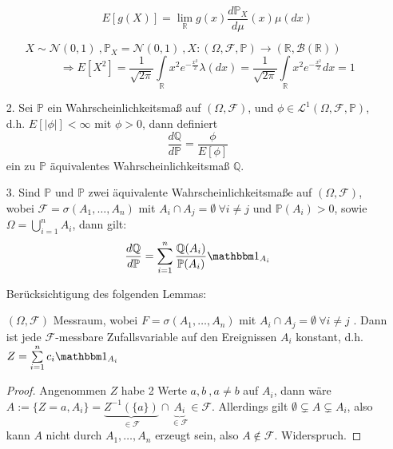 \begin{ex}
\begin{itemize}
\begin{rem}
\begin{enumerate}
\[ E[g(X)]=\lim\limits_{\mathbb R}g(x)\frac{d\mathbb P_{X}}{d\mu}(x)\mu(dx) \]
\begin{ex}
$ X\sim\mathcal N(0,1) \ , \mathbb P_{X}=\mathcal N(0,1) \ , X:(\Omega,\mathcal F,\mathbb P)\to(\mathbb R,\mathcal B(\mathbb R)) $
\[ \Longrightarrow E[X^{2}]=\frac{1}{\sqrt{2\pi}} \int\limits_{\mathbb R} x^{2}e^{-\frac{x^{2}}{2} }\lambda(dx)=\frac{1}{\sqrt{2\pi}}\int\limits_{\mathbb R} x^{2}e^{-\frac{x^{2}}{2} }dx=1 \]
\end{ex}
\end{enumerate}
\end{rem}
\item[2.] Sei $ \mathbb{P} $ ein Wahrscheinlichkeitsmaß auf $ (\Omega,\mathcal F) $, und $ \phi\in\mathcal L^{1}(\Omega,\mathcal F,\mathbb P) $, d.h. $ E[|\phi|]<\infty $ mit $ \phi>0 $, dann definiert
\[ \frac{d\mathbb Q}{d\mathbb P}=\frac{\phi}{E[\phi]} \]
ein zu $ \mathbb P $ äquivalentes Wahrscheinlichkeitsmaß $ \mathbb Q $.
\item[3.] Sind $ \mathbb P $ und $ \mathbb P $ zwei äquivalente Wahrscheinlichkeitsmaße auf $ (\Omega,\mathcal F) $, wobei $ \mathcal F=\sigma(A_{1},\hdots ,A_{n}) $ mit $ A_{i}\cap A_{j}=\emptyset \ \forall i\neq j $ und $ \mathbb{P}(A_{i})>0 $, sowie $ \Omega=\bigcup\limits_{i=1}^{n}A_{i} $, dann gilt:
\[ \frac{d\mathbb Q}{d\mathbb P}=\sum\limits_{i=1}^{n}\frac{\mathbb Q(A_{i})}{\mathbb P (A_{i})}\mathbbm 1_{A_{i}} \]
\begin{hwork}[Beweis]
Berücksichtigung des folgenden Lemmas:
\begin{lem}
$ (\Omega,\mathcal F) $ Messraum, wobei $ F=\sigma(A_{1},\hdots ,A_{n}) $ mit $ A_{i}\cap A_{j}=\emptyset \ \forall i\neq j $ . Dann ist jede $ \mathcal F $-messbare Zufallsvariable auf den Ereignissen $ A_{i} $ konstant, d.h. $ Z=\sum\limits_{i=1}^{n} c_{i}\mathbbm 1_{A_{i}} $
\end{lem}
\begin{proof}
Angenommen $ Z $ habe 2 Werte $ a,b \ ,a\neq b$ auf $ A_{i} $, dann wäre $ A:=\{ Z=a,A_{i} \}=\underbrace{Z^{-1}(\{a\})}_{\in\mathcal F}\cap \underbrace{A_{i}}_{\in\mathcal F} \in\mathcal F $.
Allerdings gilt $ \emptyset\subsetneq A\subsetneq A_{i} $, also kann $ A $ nicht durch $ A_{1},\hdots,A_{n} $ erzeugt sein, also $ A\notin\mathcal F $. Widerspruch.
\end{proof}
\end{hwork}
\end{itemize}
\end{ex}
